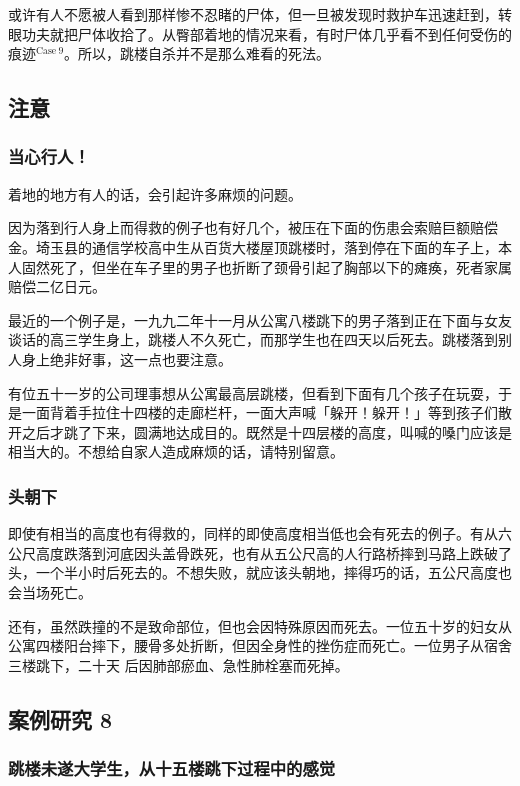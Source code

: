 \documentclass[UTF8]{ctexart}
\begin{document}
或许有人不愿被人看到那样惨不忍睹的尸体，但一旦被发现时救护车迅速赶到，转眼功夫就把尸体收拾了。从臀部着地的情况来看，有时尸体几乎看不到任何受伤的痕迹$^{\mathrm{Case\ 9}}$。所以，跳楼自杀并不是那么难看的死法。

\subsection{注意}

\subsubsection*{当心行人！}

着地的地方有人的话，会引起许多麻烦的问题。

因为落到行人身上而得救的例子也有好几个，被压在下面的伤患会索赔巨额赔偿金。埼玉县的通信学校高中生从百货大楼屋顶跳楼时，落到停在下面的车子上，本人固然死了，但坐在车子里的男子也折断了颈骨引起了胸部以下的瘫痪，死者家属赔偿二亿日元。

最近的一个例子是，一九九二年十一月从公寓八楼跳下的男子落到正在下面与女友谈话的高三学生身上，跳楼人不久死亡，而那学生也在四天以后死去。跳楼落到别人身上绝非好事，这一点也要注意。

有位五十一岁的公司理事想从公寓最高层跳楼，但看到下面有几个孩子在玩耍，于是一面背着手拉住十四楼的走廊栏杆，一面大声喊「躲开！躲开！」等到孩子们散开之后才跳了下来，圆满地达成目的。既然是十四层楼的高度，叫喊的嗓门应该是相当大的。不想给自家人造成麻烦的话，请特别留意。

\subsubsection*{头朝下}

即使有相当的高度也有得救的，同样的即使高度相当低也会有死去的例子。有从六公尺高度跌落到河底因头盖骨跌死，也有从五公尺高的人行路桥摔到马路上跌破了头，一个半小时后死去的。不想失败，就应该头朝地，摔得巧的话，五公尺高度也会当场死亡。

还有，虽然跌撞的不是致命部位，但也会因特殊原因而死去。一位五十岁的妇女从公寓四楼阳台摔下，腰骨多处折断，但因全身性的挫伤症而死亡。一位男子从宿舍三楼跳下，二十天 后因肺部瘀血、急性肺栓塞而死掉。

\subsection{案例研究 8}
\subsubsection*{跳楼未遂大学生，从十五楼跳下过程中的感觉}
\end{document}
